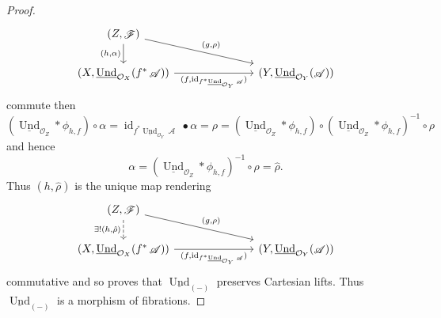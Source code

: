 \documentclass{amsart}
\theoremstyle{definition}
\DeclareMathOperator{\Ascr}{\mathscr{A}}
\DeclareMathOperator{\Fscr}{\mathscr{F}}
\DeclareMathOperator{\Ocal}{\mathcal{O}}
\DeclareMathOperator{\id}{id}
\DeclareMathOperator{\und}{Und}
\newcommand{\RelUnd}[1]{\underline{\und}_{{#1}}}
\numberwithin{equation}{subsection}
\begin{document}
\begin{proof}
	\[
		\begin{tikzcd}
		(Z,\Fscr) \ar[d, swap]{}{(h,\alpha)} \ar[drrr]{}{(g,\rho)} & & & \\
		(X,\RelUnd{\Ocal_X}(f^{\ast}\Ascr)) \ar[rrr, swap]{}{(f, \id_{f^{\ast}\RelUnd{\Ocal_Y}\Ascr})} & & & (Y,\RelUnd{\Ocal_Y}(\Ascr))
	\end{tikzcd}
	\]
	 commute then
	 \[
	 \left(\RelUnd{\Ocal_Z} \ast \phi_{h,f}\right) \circ \alpha = \id_{f^{\ast}\RelUnd{\Ocal_Y}\Ascr} \bullet \alpha = \rho = \left(\RelUnd{\Ocal_Z} \ast \phi_{h,f}\right) \circ \left(\RelUnd{\Ocal_Z} \ast \phi_{h,f}\right)^{-1} \circ \rho
	 \]
	 and hence
	 \[
	 \alpha = \left(\RelUnd{\Ocal_Z} \ast \phi_{h,f}\right)^{-1} \circ \rho = \hat{\rho}.
	 \]
	 Thus $(h,\hat{\rho})$ is the unique map rendering
	 \[
	 		\begin{tikzcd}
	 	(Z,\Fscr) \ar[d, swap, dashed]{}{\exists!(h,\hat{\rho})} \ar[drrr]{}{(g,\rho)} & & & \\	 	(X,\RelUnd{\Ocal_X}(f^{\ast}\Ascr)) \ar[rrr, swap]{}{(f, \id_{f^{\ast}\RelUnd{\Ocal_Y}\Ascr})} & & & (Y,\RelUnd{\Ocal_Y}(\Ascr))
	 \end{tikzcd}
	 \]
	 commutative and so proves that $\RelUnd{(-)}$ preserves Cartesian lifts. Thus $\RelUnd{(-)}$ is a morphism of fibrations.
\end{proof}
\end{document}

